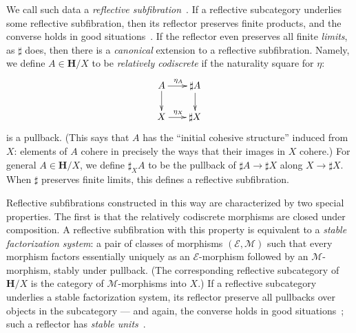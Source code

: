 \documentclass[copyright,12pt]{eptcs}
\renewcommand{\H}{\ensuremath{\mathbf{H}}\xspace}
\newcommand{\sharpsub}[1]{\sharp_{\scriptscriptstyle #1}}
\newcommand{\E}{\ensuremath{\mathcal{E}}\xspace}
\newcommand{\M}{\ensuremath{\mathcal{M}}\xspace}
\begin{document}
We call such data a \emph{reflective subfibration}~\cite{CJKP}.
If a reflective subcategory underlies some reflective subfibration, then its reflector preserves finite products, and the converse holds in good situations~\cite{ShulmanSubfibrations}.
If the reflector even preserves all finite \emph{limits}, as $\sharp$ does, then there is a \emph{canonical} extension to a reflective subfibration.
Namely, we define $A\in\H/X$ to be \emph{relatively codiscrete} if the naturality square for $\eta$:
\[\vcenter{\xymatrix@-.5pc{
    A\ar[r]^{\eta_A}\ar[d] &
    \sharp A\ar[d]\\
    X\ar[r]^{\eta_X} &
    \sharp X
  }}\]
is a pullback.
(This says that $A$ has the ``initial cohesive structure'' induced from $X$: elements of $A$ cohere in precisely the ways that their images in $X$ cohere.)
For general $A\in\H/X$, we define $\sharpsub{X}A$ to be the pullback of $\sharp A \to \sharp X$ along $X\to \sharp X$.
When $\sharp$ preserves finite limits, this defines a reflective subfibration.

Reflective subfibrations constructed in this way are characterized by two special properties.
The first is that the relatively codiscrete morphisms are closed under composition.
A reflective subfibration with this property is equivalent to a \emph{stable factorization system}: a pair of classes of morphisms $(\E,\M)$ such that every morphism factors essentially uniquely as an \E-morphism followed by an \M-morphism, stably under pullback.
(The corresponding reflective subcategory of $\H/X$
is the category of \M-morphisms into $X$.)
If a reflective subcategory underlies a stable factorization system, its reflector preserve all pullbacks over objects in the subcategory --- and again, the converse holds in good situations~\cite{ShulmanSubfibrations}; such a reflector has \emph{stable units}~\cite{CHK}.
\end{document}

